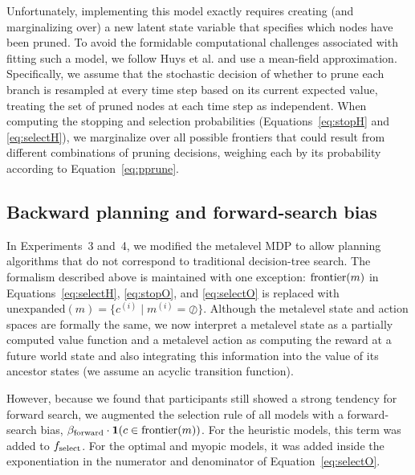 Unfortunately, implementing this model exactly requires creating (and marginalizing over) a new latent state variable that specifies which nodes have been pruned. To avoid the formidable computational challenges associated with fitting such a model, we follow Huys et al. \citep{huys2012bonsai,huys2015interplay} and use a mean-field approximation. Specifically, we assume that the stochastic decision of whether to prune each branch is resampled at every time step based on its current expected value, treating the set of pruned nodes at each time step as independent. When computing the stopping and selection probabilities (Equations~\ref{eq:stopH} and \ref{eq:selectH}), we marginalize over all possible frontiers that could result from different combinations of pruning decisions, weighing each by its probability according to Equation~\ref{eq:pprune}.

\subsection{Backward planning and forward-search bias}\label{sec:planning-backward}
In Experiments~3 and~4, we modified the metalevel MDP to allow planning algorithms that do not correspond to traditional decision-tree search. The formalism described above is maintained with one exception: $\mathrm{frontier}(m)$ in Equations~\ref{eq:selectH}, \ref{eq:stopO}, and \ref{eq:selectO} is replaced with $\mathrm{unexpanded}(m) = \{c^{(i)} \mid m^{(i)} = \oslash \}$. Although the metalevel state and action spaces are formally the same, we now interpret a metalevel state as a partially computed value function and a metalevel action as computing the reward at a future world state and also integrating this information into the value of its ancestor states (we assume an acyclic transition function).

However, because we found that participants still showed a strong tendency for forward search, we augmented the selection rule of all models with a forward-search bias, $\beta_{\mathrm{forward}} \cdot \textbf{1}(c \in \mathrm{frontier}(m))$. For the heuristic models, this term was added to $f_{\mathrm{select}}$. For the optimal and myopic models, it was added inside the exponentiation in the numerator and denominator of Equation~\ref{eq:selectO}.

